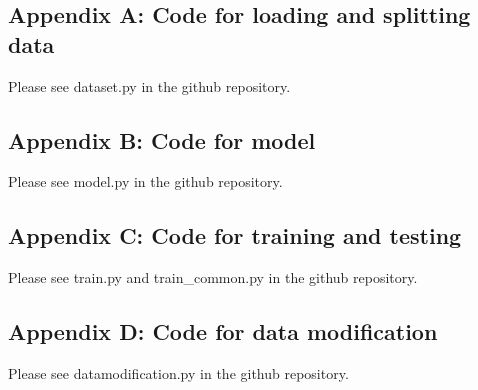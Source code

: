 \documentclass[10pt,twocolumn,letterpaper]{article}
\begin{document}
\subsection{Appendix A: Code for loading and splitting data}
Please see dataset.py in the github repository.

\subsection{Appendix B: Code for model}
Please see model.py in the github repository. 

\subsection{Appendix C: Code for training and testing}
Please see train.py and train\_common.py in the github repository.

\subsection{Appendix D: Code for data modification}
Please see datamodification.py in the github repository.


\end{document}
